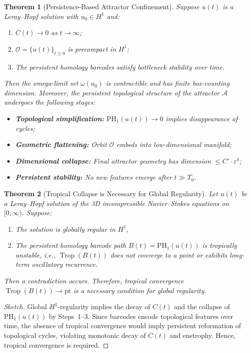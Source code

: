 \documentclass[11pt]{article}
\newtheorem{theorem}{Theorem}[section]
\theoremstyle{definition}
\begin{document}
\begin{theorem}[Persistence-Based Attractor Confinement]
\label{thm:attractor-confinement}
Suppose $u(t)$ is a Leray--Hopf solution with $u_0 \in H^1$ and:
\begin{enumerate}
  \item $C(t) \to 0$ as $t \to \infty$;
  \item $\mathcal{O} = \{ u(t) \}_{t \ge 0}$ is precompact in $H^1$;
  \item The persistent homology barcodes satisfy bottleneck stability over time.
\end{enumerate}
Then the omega-limit set $\omega(u_0)$ is contractible and has finite box-counting dimension. Moreover, the persistent topological structure of the attractor $\mathcal{A}$ undergoes the following stages:
\begin{itemize}
  \item \textbf{Topological simplification:} $\mathrm{PH}_1(u(t)) \to 0$ implies disappearance of cycles;
  \item \textbf{Geometric flattening:} Orbit $\mathcal{O}$ embeds into low-dimensional manifold;
  \item \textbf{Dimensional collapse:} Final attractor geometry has dimension $\le C' \cdot \varepsilon^{\delta}$;
  \item \textbf{Persistent stability:} No new features emerge after $t \gg T_0$.
\end{itemize}
\end{theorem}

\begin{theorem}[Tropical Collapse is Necessary for Global Regularity]
Let \( u(t) \) be a Leray--Hopf solution of the 3D incompressible Navier--Stokes equations on \( [0, \infty) \). Suppose:
\begin{enumerate}
    \item The solution is globally regular in \( H^1 \),
    \item The persistent homology barcode path \( B(t) = \mathrm{PH}_1(u(t)) \) is tropically unstable, i.e., \( \operatorname{Trop}(B(t)) \) does not converge to a point or exhibits long-term oscillatory recurrence.
\end{enumerate}
Then a contradiction occurs. Therefore, tropical convergence \( \operatorname{Trop}(B(t)) \to \text{pt} \) is a necessary condition for global regularity.
\end{theorem}

\begin{proof}[Sketch]
Global $H^1$-regularity implies the decay of $C(t)$ and the collapse of $\mathrm{PH}_1(u(t))$ by Steps~1--3. Since barcodes encode topological features over time, the absence of tropical convergence would imply persistent reformation of topological cycles, violating monotonic decay of $C(t)$ and enstrophy. Hence, tropical convergence is required.
\end{proof}
\end{document}
